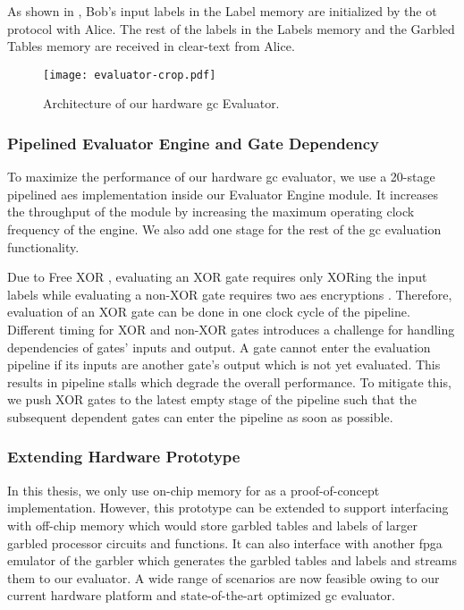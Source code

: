 As shown in , Bob's input labels in the Label memory are initialized by the \acrshort{ot} protocol with Alice.
The rest of the labels in the Labels memory and the Garbled Tables memory are received in clear-text from Alice.

\begin{figure}
\centering
\texttt{[image: evaluator-crop.pdf]}
\caption{Architecture of our hardware \acrshort{gc} Evaluator.}
\label{fig:evaluator}
\end{figure}

\subsubsection{Pipelined Evaluator Engine and Gate Dependency} \label{ssec:processor-hardware-pipeline}
To maximize the performance of our hardware \acrshort{gc} evaluator, we use a 20-stage pipelined \acrshort{aes} implementation \cite{hsing2013tiny} inside our Evaluator Engine module.
It increases the throughput of the module by increasing the maximum operating clock frequency of the engine.
We also add one stage for the rest of the \acrshort{gc} evaluation functionality.

Due to Free XOR \cite{kolesnikov2008improved}, evaluating an XOR gate requires only XORing the input labels while evaluating a non-XOR gate requires two \acrshort{aes} encryptions \cite{zahur2015two}.
Therefore, evaluation of an XOR gate can be done in one clock cycle of the pipeline.
Different timing for XOR and non-XOR gates introduces a challenge for handling dependencies of gates' inputs and output.
A gate cannot enter the evaluation pipeline if its inputs are another gate's output which is not yet evaluated.
This results in pipeline stalls which degrade the overall performance.
To mitigate this, we push XOR gates to the latest empty stage of the pipeline such that the subsequent dependent gates can enter the pipeline as soon as possible.

\subsubsection{Extending Hardware Prototype} \label{ssec:processor-hardware-extend}
In this thesis, we only use on-chip memory for as a proof-of-concept implementation.
However, this prototype can be extended to support interfacing with off-chip memory which would store garbled tables and labels of larger garbled processor circuits and functions.
It can also interface with another \acrshort{fpga} emulator of the garbler which generates the garbled tables and labels and streams them to our evaluator.
A wide range of scenarios are now feasible owing to our current hardware platform and state-of-the-art optimized \acrshort{gc} evaluator.

